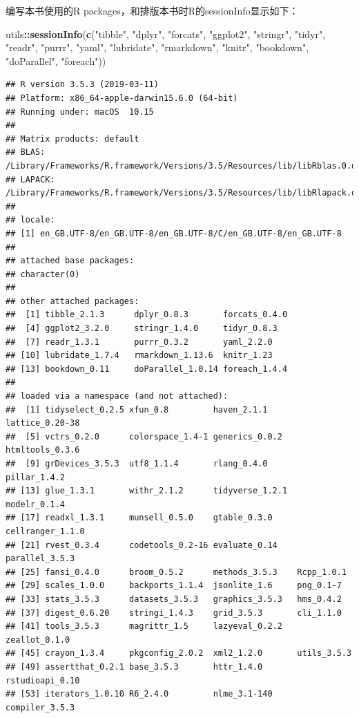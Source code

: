 \documentclass[]{book}
\newenvironment{Shaded}{\begin{snugshade}}{\end{snugshade}}
\newcommand{\KeywordTok}[1]{\textcolor[rgb]{0.13,0.29,0.53}{\textbf{#1}}}
\newcommand{\NormalTok}[1]{#1}
\newcommand{\OperatorTok}[1]{\textcolor[rgb]{0.81,0.36,0.00}{\textbf{#1}}}
\newcommand{\StringTok}[1]{\textcolor[rgb]{0.31,0.60,0.02}{#1}}
\begin{document}
编写本书使用的R packages，和排版本书时R的sessionInfo显示如下：

\begin{Shaded}
\begin{Highlighting}[]
\NormalTok{utils}\OperatorTok{::}\KeywordTok{sessionInfo}\NormalTok{(}\KeywordTok{c}\NormalTok{(}\StringTok{"tibble"}\NormalTok{, }\StringTok{"dplyr"}\NormalTok{, }\StringTok{"forcats"}\NormalTok{, }\StringTok{"ggplot2"}\NormalTok{, }\StringTok{"stringr"}\NormalTok{, }\StringTok{"tidyr"}\NormalTok{, }\StringTok{"readr"}\NormalTok{, }\StringTok{"purrr"}\NormalTok{, }\StringTok{"yaml"}\NormalTok{, }\StringTok{"lubridate"}\NormalTok{, }\StringTok{"rmarkdown"}\NormalTok{, }\StringTok{"knitr"}\NormalTok{, }\StringTok{"bookdown"}\NormalTok{, }\StringTok{"doParallel"}\NormalTok{, }\StringTok{"foreach"}\NormalTok{))}
\end{Highlighting}
\end{Shaded}

\begin{verbatim}
## R version 3.5.3 (2019-03-11)
## Platform: x86_64-apple-darwin15.6.0 (64-bit)
## Running under: macOS  10.15
## 
## Matrix products: default
## BLAS: /Library/Frameworks/R.framework/Versions/3.5/Resources/lib/libRblas.0.dylib
## LAPACK: /Library/Frameworks/R.framework/Versions/3.5/Resources/lib/libRlapack.dylib
## 
## locale:
## [1] en_GB.UTF-8/en_GB.UTF-8/en_GB.UTF-8/C/en_GB.UTF-8/en_GB.UTF-8
## 
## attached base packages:
## character(0)
## 
## other attached packages:
##  [1] tibble_2.1.3      dplyr_0.8.3       forcats_0.4.0    
##  [4] ggplot2_3.2.0     stringr_1.4.0     tidyr_0.8.3      
##  [7] readr_1.3.1       purrr_0.3.2       yaml_2.2.0       
## [10] lubridate_1.7.4   rmarkdown_1.13.6  knitr_1.23       
## [13] bookdown_0.11     doParallel_1.0.14 foreach_1.4.4    
## 
## loaded via a namespace (and not attached):
##  [1] tidyselect_0.2.5 xfun_0.8         haven_2.1.1      lattice_0.20-38 
##  [5] vctrs_0.2.0      colorspace_1.4-1 generics_0.0.2   htmltools_0.3.6 
##  [9] grDevices_3.5.3  utf8_1.1.4       rlang_0.4.0      pillar_1.4.2    
## [13] glue_1.3.1       withr_2.1.2      tidyverse_1.2.1  modelr_0.1.4    
## [17] readxl_1.3.1     munsell_0.5.0    gtable_0.3.0     cellranger_1.1.0
## [21] rvest_0.3.4      codetools_0.2-16 evaluate_0.14    parallel_3.5.3  
## [25] fansi_0.4.0      broom_0.5.2      methods_3.5.3    Rcpp_1.0.1      
## [29] scales_1.0.0     backports_1.1.4  jsonlite_1.6     png_0.1-7       
## [33] stats_3.5.3      datasets_3.5.3   graphics_3.5.3   hms_0.4.2       
## [37] digest_0.6.20    stringi_1.4.3    grid_3.5.3       cli_1.1.0       
## [41] tools_3.5.3      magrittr_1.5     lazyeval_0.2.2   zeallot_0.1.0   
## [45] crayon_1.3.4     pkgconfig_2.0.2  xml2_1.2.0       utils_3.5.3     
## [49] assertthat_0.2.1 base_3.5.3       httr_1.4.0       rstudioapi_0.10 
## [53] iterators_1.0.10 R6_2.4.0         nlme_3.1-140     compiler_3.5.3
\end{verbatim}
\end{document}
